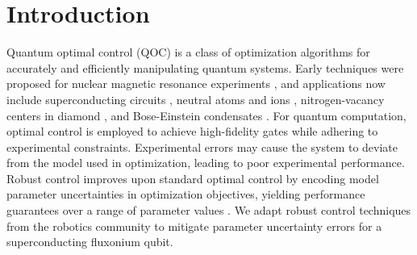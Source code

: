 \section{Introduction}
Quantum optimal control (QOC) is a class of optimization
algorithms for accurately and efficiently manipulating quantum systems.
Early techniques were proposed for nuclear magnetic resonance experiments
\cite{vandersypen2005nmr, kehlet2004improving, khaneja2005optimal,
  maximov2008optimal, nielsen2010optimal, skinner2003application, tosner2009optimal},
and applications now include superconducting circuits \cite{abdelhafez2020universal,
  chakram2020multimode, fisher2010optimal, gokhale2019partial,
  huang2020engineering, leng2019robust, leung2017speedup, li2020fast,
  xu2020nonadiabatic},
neutral atoms and ions \cite{brouzos2015quantum,
  de2008optimal, goerz2011quantum, guo2019high, jensen2019time,
  larrouy2020fast, omran2019generation, rosi2013fast, sorensen2019qengine,
  treutlein2006microwave, van2016optimal},
nitrogen-vacancy centers in diamond \cite{chou2015optimal,
  dolde2014high, geng2016experimental,
  nobauer2015smooth, poggiali2018optimal, rembold2020introduction, tian2019optimal},
and Bose-Einstein condensates \cite{amri2019optimal, sorensen2018quantum}.
For quantum computation,
optimal control is employed to achieve high-fidelity gates
while adhering to experimental constraints.
Experimental errors may cause the system to deviate
from the model used in optimization, leading
to poor experimental performance.
Robust control improves upon
standard optimal control by encoding
model parameter uncertainties
in optimization objectives, yielding performance
guarantees over a range of parameter values \cite{Zhou97,Morimoto00,Manchester18}.
We adapt robust control techniques from the robotics community to mitigate
parameter uncertainty errors for
a superconducting fluxonium qubit.

